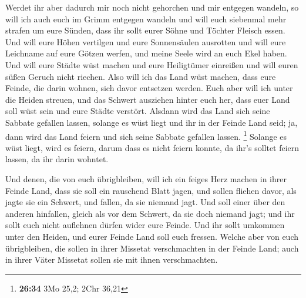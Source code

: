  Werdet ihr aber dadurch mir noch nicht gehorchen und mir
entgegen wandeln,  so will ich auch euch im Grimm
entgegen wandeln und will euch siebenmal mehr strafen um eure Sünden,
 dass ihr sollt eurer Söhne und Töchter Fleisch essen.
 Und will eure Höhen vertilgen und eure Sonnensäulen
ausrotten und will eure Leichname auf eure Götzen werfen, und meine
Seele wird an euch Ekel haben.  Und will eure Städte wüst
machen und eure Heiligtümer einreißen und will euren süßen Geruch nicht
riechen.  Also will ich das Land wüst machen, dass eure
Feinde, die darin wohnen, sich davor entsetzen werden. 
Euch aber will ich unter die Heiden streuen, und das Schwert ausziehen
hinter euch her, dass euer Land soll wüst sein und eure Städte verstört.
 Alsdann wird das Land sich seine Sabbate gefallen
lassen, solange es wüst liegt und ihr in der Feinde Land seid; ja, dann
wird das Land feiern und sich seine Sabbate gefallen lassen. \footnote{\textbf{26:34}
  3Mo 25,2; 2Chr 36,21}  Solange es wüst liegt, wird es
feiern, darum dass es nicht feiern konnte, da ihr's solltet feiern
lassen, da ihr darin wohntet.

 Und denen, die von euch übrigbleiben, will ich ein
feiges Herz machen in ihrer Feinde Land, dass sie soll ein rauschend
Blatt jagen, und sollen fliehen davor, als jagte sie ein Schwert, und
fallen, da sie niemand jagt.  Und soll einer über den
anderen hinfallen, gleich als vor dem Schwert, da sie doch niemand jagt;
und ihr sollt euch nicht auflehnen dürfen wider eure Feinde.
 Und ihr sollt umkommen unter den Heiden, und eurer
Feinde Land soll euch fressen.  Welche aber von euch
übrigbleiben, die sollen in ihrer Missetat verschmachten in der Feinde
Land; auch in ihrer Väter Missetat sollen sie mit ihnen verschmachten.

